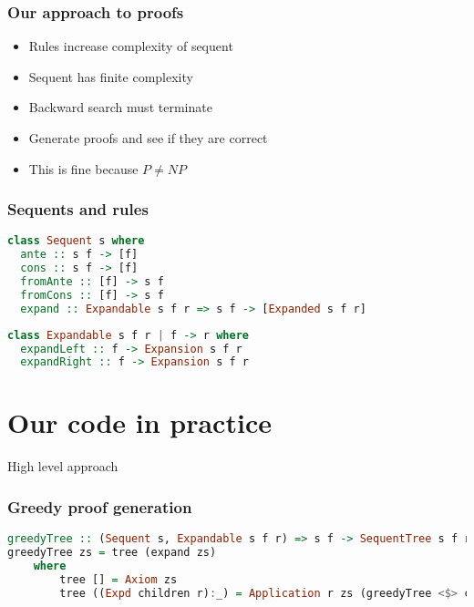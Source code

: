 \documentclass{beamer}
\begin{document}
\begin{frame}
    \frametitle{Our approach to proofs}

    \begin{itemize}
        \item Rules increase complexity of sequent
        \item Sequent has finite complexity
        \item Backward search must terminate
        \item Generate proofs and see if they are correct
        \item This is fine because \(P\neq NP\)
    \end{itemize}

\end{frame}

\begin{frame}[fragile]
    \frametitle{Sequents and rules}

    \begin{lstlisting}[language=Haskell]
class Sequent s where
  ante :: s f -> [f]
  cons :: s f -> [f]
  fromAnte :: [f] -> s f
  fromCons :: [f] -> s f
  expand :: Expandable s f r => s f -> [Expanded s f r]
    \end{lstlisting}

    \begin{lstlisting}[language=Haskell]
class Expandable s f r | f -> r where
  expandLeft :: f -> Expansion s f r
  expandRight :: f -> Expansion s f r
    \end{lstlisting}
\end{frame}

\section{Our code in practice}

\begin{frame}{High level approach}

\end{frame}

\begin{frame}[fragile]
    \frametitle{Greedy proof generation}

    \begin{lstlisting}[language=Haskell]
greedyTree :: (Sequent s, Expandable s f r) => s f -> SequentTree s f r
greedyTree zs = tree (expand zs)
    where
        tree [] = Axiom zs
        tree ((Expd children r):_) = Application r zs (greedyTree <$> children)
    \end{lstlisting}

\end{frame}
\end{document}
